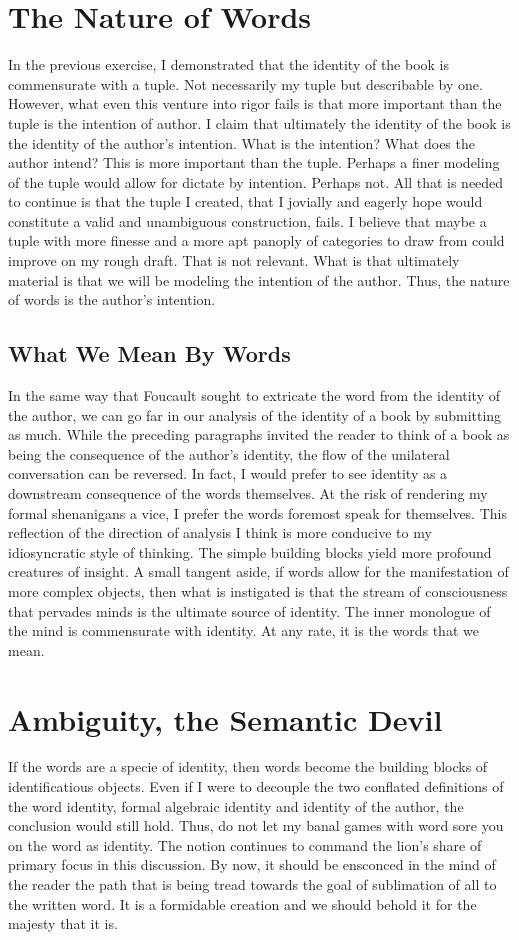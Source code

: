 \documentclass[12pt]{article}
\begin{document}
\section{The Nature of Words}
In the previous exercise, I demonstrated that the identity of the book is
commensurate with a tuple. Not necessarily my tuple but describable by one.
However, what even this venture into rigor fails is that more important than the
tuple is the intention of author. I claim that ultimately the identity of the
book is the identity of the author's intention. What is the intention? What does
the author intend? This is more important than the tuple. Perhaps a finer
modeling of the tuple would allow for dictate by intention. Perhaps not. All
that is needed to continue is that the tuple I created, that I jovially and
eagerly hope would constitute a valid and unambiguous construction, fails. I
believe that maybe a tuple with more finesse and a more apt panoply of
categories to draw from could improve on my rough draft. That is not relevant.
What is that ultimately material is that we will be modeling the intention of
the author. Thus, the nature of words is the author's intention.

\subsection{What We Mean By Words}
In the same way that Foucault sought to extricate the word from the identity of
the author, we can go far in our analysis of the identity of a book by
submitting as much. While the preceding paragraphs invited the reader to think
of a book as being the consequence of the author's identity, the flow of the
unilateral conversation can be reversed. In fact, I would prefer to see identity
as a downstream consequence of the words themselves. At the risk of rendering my
formal shenanigans a vice, I prefer the words foremost speak for themselves.
This reflection of the direction of analysis I think is more conducive to my
idiosyncratic style of thinking. The simple building blocks yield more profound
creatures of insight. A small tangent aside, if words allow for the
manifestation of more complex objects, then what is instigated is that the
stream of consciousness that pervades minds is the ultimate source of identity.
The inner monologue of the mind is commensurate with identity. At any rate, it is
the words that we mean.

\section{Ambiguity, the Semantic Devil}
If the words are a specie of identity, then words become the building blocks of
identificatious objects. Even if I were to decouple the two conflated
definitions of the word identity, formal algebraic identity and identity of the
author, the conclusion would still hold. Thus, do not let my banal games with
word sore you on the word as identity. The notion continues to command the
lion's share of primary focus in this discussion. By now, it should be ensconced
in the mind of the reader the path that is being tread towards the goal of
sublimation of all to the written word. It is a formidable creation and we
should behold it for the majesty that it is. 
\end{document}
